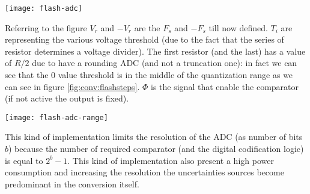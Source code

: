 		\begin{SCfigure}[2][bht]
			\centering
			\texttt{[image: flash-adc]}
			\caption{implementation of a $3bit$ flash analog to digital converter.}
			\label{fig:conv:flash}
		\end{SCfigure}
		
		
		Referring to the figure $V_r$ and $-V_r$ are the $F_s$ and $-F_s$ till now defined. $T_i$ are representing the various voltage threshold (due to the fact that the series of resistor determines a voltage divider). The first resistor (and the last) has a value of $R/2$ due to have a rounding ADC (and not a truncation one): in fact we can see that the $0$ value threshold is in the middle of the quantization range as we can see in figure \ref{fig:conv:flashsteps}. $\Phi$ is the signal that enable the comparator (if not active the output is fixed).
		
		\begin{SCfigure}[1][bht]
			\centering \texttt{[image: flash-adc-range]}
			\caption{ideal quantization of the flash analog to digital converter.}
			\label{fig:conv:flashsteps}
		\end{SCfigure}
		
		This kind of implementation limits the resolution of the ADC (as number of bits $b$) because the number of required comparator (and the digital codification logic) is equal to $2^b-1$. This kind of implementation also present a high power consumption and increasing the resolution the uncertainties sources become predominant in the conversion itself.
		

